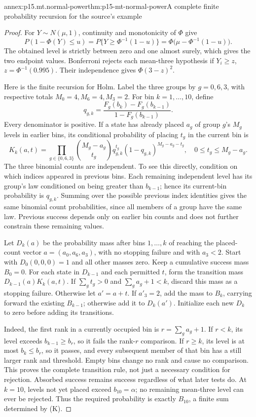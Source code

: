 \begin{annexitem}{annex:p15.mt.normal-power}{thm:p15-mt-normal-power}{A complete finite probability recursion for the source's example}
\begin{proof}
For \(Y\sim N(\mu,1)\), continuity and monotonicity of \(\Phi\) give
\[
 P(1-\Phi(Y)\leq u)
 =P\{Y\geq\Phi^{-1}(1-u)\}
 =\Phi\bigl(\mu-\Phi^{-1}(1-u)\bigr).
\]
The obtained level is strictly between zero and one almost surely,
which gives the two endpoint values.
Bonferroni rejects each mean-three hypothesis if
\(Y_i\geq z\), \(z=\Phi^{-1}(0.995)\).
Their independence gives \(\Phi(3-z)^2\).

Here is the finite recursion for Holm. Label the three groups by
\(g=0,6,3\), with respective totals
\(M_0=4,M_6=4,M_3=2\). For bin \(k=1,\ldots,10\), define
\[
 q_{g,k}=
 \frac{F_g(b_k)-F_g(b_{k-1})}{1-F_g(b_{k-1})}.
\]
Every denominator is positive. If a state has already placed
\(a_g\) of group \(g\)'s \(M_g\) levels in earlier bins, its conditional
probability of placing \(t_g\) in the current bin is
\[
 K_k(a,t)=\prod_{g\in\{0,6,3\}}
       \binom{M_g-a_g}{t_g}
       q_{g,k}^{t_g}(1-q_{g,k})^{M_g-a_g-t_g},
       \quad0\leq t_g\leq M_g-a_g.                            \tag{K}
\]
The three binomial counts are independent. To see this directly,
condition on which indices appeared in previous bins. Each remaining
independent level has its group's law conditioned on being greater
than \(b_{k-1}\); hence its current-bin probability is \(q_{g,k}\).
Summing over the possible previous index identities gives the same
binomial count probabilities, since all members of a group have the
same law. Previous success depends only on earlier bin counts and
does not further constrain these remaining values.

Let \(D_k(a)\) be the probability mass after bins \(1,\ldots,k\) of
reaching the placed-count vector \(a=(a_0,a_6,a_3)\), with no stopping
failure and with \(a_3<2\). Start with \(D_0(0,0,0)=1\) and all other
masses zero. Keep a cumulative success mass \(B_0=0\).
For each state in \(D_{k-1}\) and each permitted \(t\), form the
transition mass \(D_{k-1}(a)K_k(a,t)\).
If \(\sum_gt_g>0\) and \(\sum_ga_g+1<k\), discard this mass as a
stopping failure. Otherwise let \(a'=a+t\). If \(a'_3=2\), add the
mass to \(B_k\), carrying forward the existing \(B_{k-1}\); otherwise
add it to \(D_k(a')\). Initialize each new \(D_k\) to zero before
adding its transitions.

Indeed, the first rank in a currently occupied bin is
\(r=\sum_ga_g+1\). If \(r<k\), its level exceeds \(b_{k-1}\geq b_r\),
so it fails the rank-\(r\) comparison. If \(r\geq k\), its level is
at most \(b_k\leq b_r\), so it passes, and every subsequent member
of that bin has a still larger rank and threshold. Empty bins change
no rank and cause no comparison. This proves the complete transition
rule, not just a necessary condition for rejection.
Absorbed success remains success regardless of what later tests do.
At \(k=10\), levels not yet placed exceed \(b_{10}=\alpha\);
no remaining mean-three level can ever be rejected. Thus the required
probability is exactly \(B_{10}\), a finite sum determined by (K).


\end{proof}
\end{annexitem}
